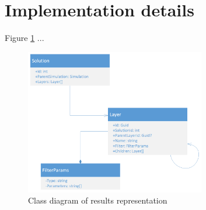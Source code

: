 \section{Implementation details}
\label{sec:implementation-details}




Figure \ref{fig:results-class-diagram} ...

\begin{figure}[H]
    \centering
    \includegraphics[width=0.7\textwidth]{figures/chapter-data-management/results-class-diagram}
    \decoRule
    \caption{Class diagram of results representation}
    \label{fig:results-class-diagram}
\end{figure}